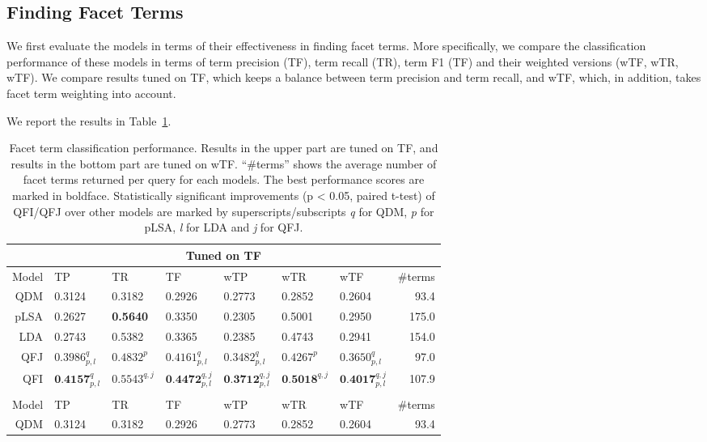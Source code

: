 \subsection{Finding Facet Terms}
\label{sec:expt}
We first evaluate the models in terms of their effectiveness in finding facet terms. More specifically, we compare the classification performance of these models in terms of term precision (TF), term recall (TR), term F1 (TF) and their weighted versions (wTF, wTR, wTF). We compare results tuned on TF, which keeps a balance between term precision and term recall, and wTF, which, in addition, takes facet term weighting into account.


We report the results in Table~\ref{tab:intrinsic-tf}. 
\begin{table}[!ht]
\centering
\caption{Facet term classification performance. Results in the upper part are tuned on TF, and results in the bottom part are tuned on wTF. ``\#terms'' shows the average number of facet terms returned per query for each models. The best performance scores are marked in boldface. Statistically significant improvements (p < 0.05, paired t-test) of QFI/QFJ over other models are marked by superscripts/subscripts \textit{q} for QDM, \textit{p} for pLSA, \textit{l} for LDA and \textit{j} for QFJ.}
\label{tab:intrinsic-tf}
\setlength\tabcolsep{4pt}
\begin{tabular}{|r|l|l|l|l|l|l|r|} \hline
\multicolumn{8}{|c|}{Tuned on TF} \\\hline
Model& TP & TR & TF & wTP & wTR & wTF & \#terms \\ \hline
QDM & 0.3124 & 0.3182 & 0.2926 & 0.2773 & 0.2852 & 0.2604 & 93.4 \\\hline
pLSA & 0.2627 & \textbf{0.5640} & 0.3350 & 0.2305 & 0.5001 & 0.2950 & 175.0 \\ \hline
LDA & 0.2743 & 0.5382 & 0.3365 & 0.2385 & 0.4743 & 0.2941 & 154.0 \\ \hline
QFJ & $0.3986^{q}_{p,l}$ & $0.4832^{p}$ & $0.4161^{q}_{p,l}$ & $0.3482^{q}_{p,l}$ & $0.4267^{p}$ & $0.3650^{q}_{p,l}$ & 97.0 \\ \hline
QFI & $\textbf{0.4157}^{q}_{p,l}$ & $0.5543^{q,j}$ & $\textbf{0.4472}^{q,j}_{p,l}$ & $\textbf{0.3712}^{q,j}_{p,l}$ & $\textbf{0.5018}^{q,j}$ & $\textbf{0.4017}^{q,j}_{p,l}$ & 107.9 \\ 
\hhline{|========|}
\multicolumn{8}{|c|}{Tuned on wTF} \\\hline
Model& TP & TR & TF & wTP & wTR & wTF & \#terms \\ \hline
QDM & 0.3124 & 0.3182 & 0.2926 & 0.2773 & 0.2852 & 0.2604 & 93.4 \\ \hline

\end{tabular}
\end{table}
